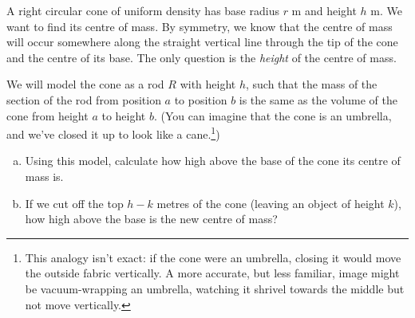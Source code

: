 \begin{Mquestion}\label{prob_s2.3:cone}
A right circular cone of uniform density has base radius $r$ m and height $h$ m. We want to find its centre of mass. By symmetry, we know that the centre of mass will occur somewhere along the straight vertical line through the tip of the cone and the centre of its base. The only question is the \emph{height} of the centre of mass.

\begin{center}
\end{center}

We will model the cone as a rod $R$ with height $h$, such that the mass of the section of the rod from position $a$ to position $b$ is the same as the volume of the cone from height $a$ to height $b$. (You can imagine that the cone is an umbrella, and we've closed it up to look like a cane.\footnote{This analogy isn't exact: if the cone were an umbrella, closing it would move the outside fabric vertically. A more accurate, but less familiar, image might be vacuum-wrapping an umbrella, watching it shrivel towards the middle but not move vertically.})


\begin{center}
\end{center}


\begin{enumerate}[(a)]
\item Using this model, calculate how high above the base of the cone its centre of mass is.
\item If we cut off the top $h-k$ metres of the cone (leaving an object of height $k$), how high above the base is the new centre of mass?
\end{enumerate}

\end{Mquestion}
